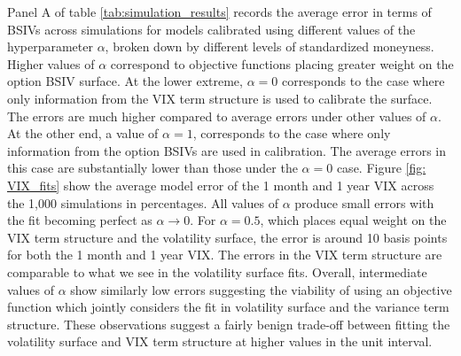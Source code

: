 \documentclass[12pt]{article}
\begin{document}
Panel A of table \ref{tab:simulation_results}  records the average error in terms of BSIVs across simulations for models calibrated using different values of the hyperparameter $\alpha$, broken down by different levels of standardized moneyness. Higher values of $\alpha$ correspond to objective functions placing greater weight on the option BSIV surface. At the lower extreme, $\alpha = 0$ corresponds to the case where only information from the VIX term structure is used to calibrate the surface. The errors are much higher compared to average errors under other values of $\alpha$. At the other end, a value of $\alpha = 1$, corresponds to the case where only information from the option BSIVs are used in calibration. The average errors in this case are substantially lower than those under the $\alpha = 0$ case. Figure \ref{fig: VIX_fits} show the average model error of the 1 month and 1 year VIX across the 1,000 simulations in percentages. All values of $\alpha$ produce small errors with the fit becoming perfect as $\alpha \to 0$. For $\alpha = 0.5$, which places equal weight on the VIX term structure and the volatility surface, the error is around 10 basis points for both the 1 month and 1 year VIX. The errors in the VIX term structure are comparable to what we see in the volatility surface fits. Overall, intermediate values of $\alpha$ show similarly low errors suggesting the viability of using an objective function which jointly considers the fit in volatility surface and the variance term structure. These observations suggest a fairly benign trade-off between fitting the volatility surface and VIX term structure at higher values in the unit interval.
 
\end{document}
